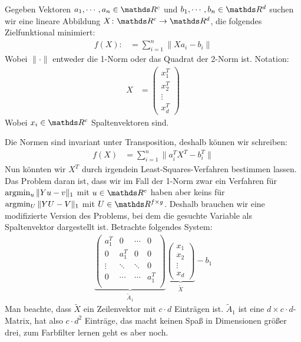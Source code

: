 

Gegeben Vektoren $a_1, \cdots, a_n \in \R^c$ und $b_1, \cdots, b_n \in \R^d$ suchen wir eine lineare Abbildung $X \colon \R^c \to \R^d$, die folgendes Zielfunktional minimiert:
%
\begin{align*}
f(X) :&= \sum\limits_{i=1}^n \|X a_i - b_i\|
\end{align*}
%
Wobei $\|\cdot\|$ entweder die 1-Norm oder das Quadrat der 2-Norm ist.
Notation:
%
\begin{align*}
X &= \begin{pmatrix} x_1^T \\ x_2^T \\ \vdots \\ x_d^T \end{pmatrix}
\end{align*}
%
Wobei $x_i \in \R^c$ Spaltenvektoren sind.

Die Normen sind invariant unter Transposition, deshalb können wir schreiben:
%
\begin{align*}
f(X) &= \sum\limits_{i=1}^n \|a_i^T X^T - b_i^T\|
\end{align*}
%
Nun könnten wir $X^T$ durch irgendein Least-Squares-Verfahren bestimmen lassen.
Das Problem daran ist, dass wir im Fall der 1-Norm zwar ein Verfahren für
$\arg\!\min_u \|Yu-v\|_1$ mit $u \in \R^e$ haben aber keins für
$\arg\!\min_U \|YU-V\|_1$ mit $U \in \R^{f \times g}$.
Deshalb brauchen wir eine modifizierte Version des Problems, bei dem die gesuchte Variable
als Spaltenvektor dargestellt ist.
Betrachte folgendes System:
%
\begin{align*}
\underbrace{
\begin{pmatrix}
a_1^T & 0 & \cdots & 0 \\
0 & a_1^T & 0 & 0 \\
\vdots & \ddots & \ddots & 0 \\
0 & \cdots & \cdots & a_1^T \\
\end{pmatrix}
}_{\tilde A_1}
\underbrace{
\begin{pmatrix}
x_1 \\ x_2 \\ \vdots \\ x_d
\end{pmatrix}
}_{\tilde X}
-
b_1
\end{align*}
%
Man beachte, dass $\tilde X$ ein Zeilenvektor mit $c\cdot d$ Einträgen ist.
$\tilde A_1$ ist eine $d \times c \cdot d$-Matrix, hat also $c \cdot d^2$ Einträge,
das macht keinen Spaß in Dimensionen größer drei, zum Farbfilter lernen geht es aber noch.

